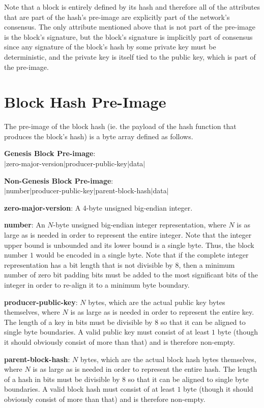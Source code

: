 \documentclass[12pt]{article}
\begin{document}
Note that a block is entirely defined by its hash and therefore all of the attributes that are part of the hash's pre-image are explicitly part of the network's consensus. The only attribute mentioned above that is not part of the pre-image is the block's signature, but the block's signature is implicitly part of consensus since any signature of the block's hash by some private key must be deterministic, and the private key is itself tied to the public key, which is part of the pre-image.

\section{Block Hash Pre-Image}
The pre-image of the block hash (ie. the payload of the hash function that produces the block's hash) is a byte array defined as follows.

\vspace{5mm}
\textbf{Genesis Block Pre-image}: 
\\$|$zero-major-version$|$producer-public-key$|$data$|$

\textbf{Non-Genesis Block Pre-image}: 
\\$|$number$|$producer-public-key$|$parent-block-hash$|$data$|$
\vspace{5mm}

\textbf{zero-major-version}: A 4-byte unsigned big-endian integer.

\textbf{number}: An $N$-byte unsigned big-endian integer representation, where $N$ is as large as is needed in order to represent the entire integer. Note that the integer upper bound is unbounded and its lower bound is a single byte. Thus, the block number $1$ would be encoded in a single byte. Note that if the complete integer representation has a bit length that is not divisible by 8, then a minimum number of zero bit padding bits must be added to the most significant bits of the integer in order to re-align it to a minimum byte boundary.

\textbf{producer-public-key}: $N$ bytes, which are the actual public key bytes themselves, where $N$ is as large as is needed in order to represent the entire key. The length of a key in bits must be divisible by 8 so that it can be aligned to single byte boundaries. A valid public key must consist of at least $1$ byte (though it should obviously consist of more than that) and is therefore non-empty.

\textbf{parent-block-hash}: $N$ bytes, which are the actual block hash bytes themselves, where $N$ is as large as is needed in order to represent the entire hash. The length of a hash in bits must be divisible by 8 so that it can be aligned to single byte boundaries. A valid block hash must consist of at least $1$ byte (though it should obviously consist of more than that) and is therefore non-empty.
\end{document}
